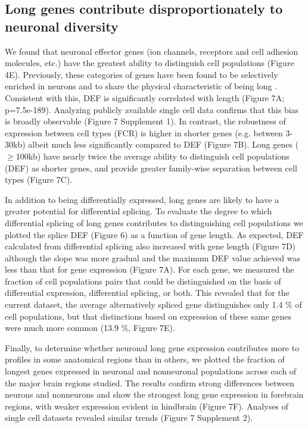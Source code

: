 \subsection{Long genes contribute disproportionately to neuronal diversity}

We found that neuronal effector genes (ion channels, receptors and cell adhesion molecules, etc.) have the greatest ability to distinguish cell populations (Figure 4E). Previously, these categories of genes have been found to be selectively enriched in neurons and to share the physical characteristic of being long \citep{Sugino_2014,Gabel_2015,Zylka_2015}. Consistent with this, DEF is significantly correlated with length (Figure 7A; p=7.5e-189). Analyzing publicly available single cell data confirms that this bias is broadly observable (Figure 7 Supplement 1). In contrast, the robustness of expression between cell types (FCR) is higher in shorter genes (e.g. between 3-30kb) albeit much less significantly compared to DEF (Figure 7B). Long genes ($\geq$100kb) have nearly twice the average ability to distinguish cell populations (DEF) as shorter genes, and provide greater family-wise separation between cell types (Figure 7C).  

In addition to being differentially expressed, long genes are likely to have a greater potential for differential splicing. To evaluate the degree to which differential splicing of long genes contributes to distinguishing cell populations we plotted the splice DEF (Figure 6) as a function of gene length. As expected, DEF calculated from differential splicing also increased with gene length (Figure 7D) although the slope was more gradual and the maximum DEF value achieved was less than that for gene expression (Figure 7A). For each gene, we measured the fraction of cell populations pairs that could be distinguished on the basis of differential expression, differential splicing, or both. This revealed that for the current dataset, the average alternatively spliced gene distinguishes only 1.4 \% of cell populations, but that distinctions based on expression of these same genes were much more common (13.9 \%, Figure 7E). 

Finally, to determine whether neuronal long gene expression contributes more to profiles in some anatomical regions than in others, we plotted the fraction of longest genes expressed in neuronal and nonneuronal populations across each of the major brain regions studied. The results confirm strong differences between neurons and nonneurons and show the strongest long gene expression in forebrain regions, with weaker expression evident in hindbrain (Figure 7F). Analyses of single cell datasets revealed similar trends (Figure 7 Supplement 2). 


